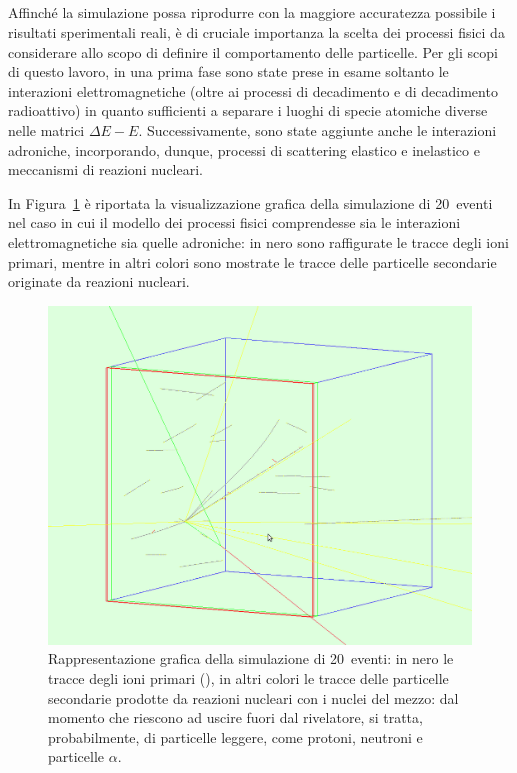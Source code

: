 \subsection{}


Affinché la simulazione possa riprodurre con la maggiore accuratezza possibile i risultati sperimentali reali, è di cruciale importanza la scelta dei processi fisici da considerare allo scopo di definire il comportamento delle particelle.
Per gli scopi di questo lavoro, in una prima fase sono state prese in esame soltanto le interazioni elettromagnetiche (oltre ai processi di decadimento e di decadimento radioattivo) in quanto sufficienti a separare i luoghi di specie atomiche diverse nelle matrici $\Delta E - E$.
Successivamente, sono state aggiunte anche le interazioni adroniche, incorporando, dunque, processi di scattering elastico e inelastico e meccanismi di reazioni nucleari.

In Figura~\ref{fig:simulazione_evento} è riportata la visualizzazione grafica della simulazione di 20~eventi nel caso in cui il modello dei processi fisici comprendesse sia le interazioni elettromagnetiche sia quelle adroniche: in nero sono raffigurate le tracce degli ioni primari, mentre in altri colori sono mostrate le tracce delle particelle secondarie originate da reazioni nucleari. 



\begin{figure} [!p]
	\centering
	\includegraphics[width=\textwidth, keepaspectratio]{Grafici/evento5_ritagliato.png}
	\caption{Rappresentazione grafica della simulazione di 20~eventi: in nero le tracce degli ioni primari (), in altri colori le tracce delle particelle secondarie prodotte da reazioni nucleari con i nuclei del mezzo: dal momento che riescono ad uscire fuori dal rivelatore, si tratta, probabilmente, di particelle leggere, come protoni, neutroni e particelle $\alpha$.} \label{fig:simulazione_evento}
\end{figure}




